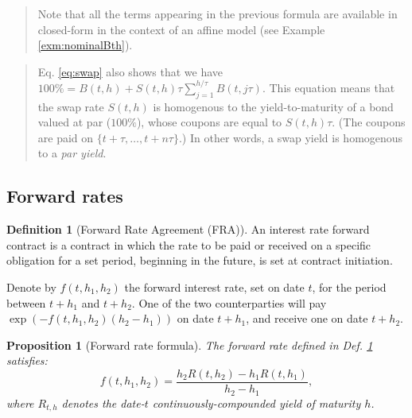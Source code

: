 \documentclass[
  12pt,
]{book}
\newtheorem{proposition}{Proposition}[chapter]
\theoremstyle{definition}
\newtheorem{definition}{Definition}[chapter]
\theoremstyle{definition}
\theoremstyle{definition}
\theoremstyle{definition}
\theoremstyle{remark}
\begin{document}
\begin{quote}
Note that all the terms appearing in the previous formula are available in closed-form in the context of an affine model (see Example \ref{exm:nominalBth}).
\end{quote}

\begin{quote}
Eq. \eqref{eq:swap} also shows that we have \(100\% = B(t,h) + S(t,h) \tau \sum_{j=1}^{h/\tau} B(t,j\tau)\). This equation means that the swap rate \(S(t,h)\) is homogenous to the yield-to-maturity of a bond valued at par (\(100\%\)), whose coupons are equal to \(S(t,h) \tau\). (The coupons are paid on \(\{t+\tau,\dots,t+n\tau\}\).) In other words, a swap yield is homogenous to a \emph{par yield}.
\end{quote}

\hypertarget{FWD}{%
\subsection{Forward rates}\label{FWD}}

\begin{definition}[Forward Rate Agreement (FRA)]
\protect\hypertarget{def:FWD}{}\label{def:FWD}An interest rate forward contract is a contract in which the rate to be paid or received on a specific obligation for a set period, beginning in the future, is set at contract initiation.

Denote by \(f(t,h_1,h_2)\) the forward interest rate, set on date \(t\), for the period between \(t+h_1\) and \(t+h_2\). One of the two counterparties will pay \(\exp(-f(t,h_1,h_2)(h_2 - h_1))\) on date \(t+h_1\), and receive one on date \(t+h_2\).
\end{definition}

\begin{proposition}[Forward rate formula]
\protect\hypertarget{prp:fwd}{}\label{prp:fwd}The forward rate defined in Def. \ref{def:FWD} satisfies:
\begin{equation}
\boxed{f(t,h_1,h_2) = \frac{h_2 R(t,h_2) - h_1 R(t,h_1)}{h_2 - h_1},}\label{eq:forward}
\end{equation}
where \(R_{t,h}\) denotes the date-\(t\) continuously-compounded yield of maturity \(h\).
\end{proposition}
\end{document}
